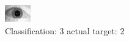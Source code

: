 \begin{figure}[h!]
\begin{center}
\includegraphics[width=0.60\columnwidth]{figures/ID1779_class_3_target_2.png}
\end{center}
\caption{ Classification: 3 actual target: 2}
\label{fig:ID1779_class_3_target_2}
\end{figure}
